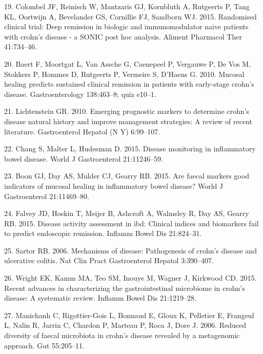 \documentclass[12pt,]{article}
\begin{document}
\hypertarget{ref-colombel_deepremission_2015}{}
19. Colombel JF, Reinisch W, Mantzaris GJ, Kornbluth A, Rutgeerts P,
Tang KL, Oortwijn A, Bevelander GS, Cornillie FJ, Sandborn WJ. 2015.
Randomised clinical trial: Deep remission in biologic and
immunomodulator naive patients with crohn's disease - a SONIC post hoc
analysis. Aliment Pharmacol Ther 41:734--46.

\hypertarget{ref-baert_mucosalhealing_2010}{}
20. Baert F, Moortgat L, Van Assche G, Caenepeel P, Vergauwe P, De Vos
M, Stokkers P, Hommes D, Rutgeerts P, Vermeire S, D'Haens G. 2010.
Mucosal healing predicts sustained clinical remission in patients with
early-stage crohn's disease. Gastroenterology 138:463--8; quiz e10--1.

\hypertarget{ref-Lichtenstein_biomarkers_2010}{}
21. Lichtenstein GR. 2010. Emerging prognostic markers to determine
crohn's disease natural history and improve management strategies: A
review of recent literature. Gastroenterol Hepatol (N Y) 6:99--107.

\hypertarget{ref-Chang_biomarkers_2015}{}
22. Chang S, Malter L, Hudesman D. 2015. Disease monitoring in
inflammatory bowel disease. World J Gastroenterol 21:11246--59.

\hypertarget{ref-Boon_biomarkers_2015}{}
23. Boon GJ, Day AS, Mulder CJ, Gearry RB. 2015. Are faecal markers good
indicators of mucosal healing in inflammatory bowel disease? World J
Gastroenterol 21:11469--80.

\hypertarget{ref-Falvey_biomarkers_2015}{}
24. Falvey JD, Hoskin T, Meijer B, Ashcroft A, Walmsley R, Day AS,
Gearry RB. 2015. Disease activity assessment in ibd: Clinical indices
and biomarkers fail to predict endoscopic remission. Inflamm Bowel Dis
21:824--31.

\hypertarget{ref-sartor_IBDpath_2006}{}
25. Sartor RB. 2006. Mechanisms of disease: Pathogenesis of crohn's
disease and ulcerative colitis. Nat Clin Pract Gastroenterol Hepatol
3:390--407.

\hypertarget{ref-wright_CDmicrobiome_2015}{}
26. Wright EK, Kamm MA, Teo SM, Inouye M, Wagner J, Kirkwood CD. 2015.
Recent advances in characterizing the gastrointestinal microbiome in
crohn's disease: A systematic review. Inflamm Bowel Dis 21:1219--28.

\hypertarget{ref-manichanh_diversityCD_2006}{}
27. Manichanh C, Rigottier-Gois L, Bonnaud E, Gloux K, Pelletier E,
Frangeul L, Nalin R, Jarrin C, Chardon P, Marteau P, Roca J, Dore J.
2006. Reduced diversity of faecal microbiota in crohn's disease revealed
by a metagenomic approach. Gut 55:205--11.
\end{document}

